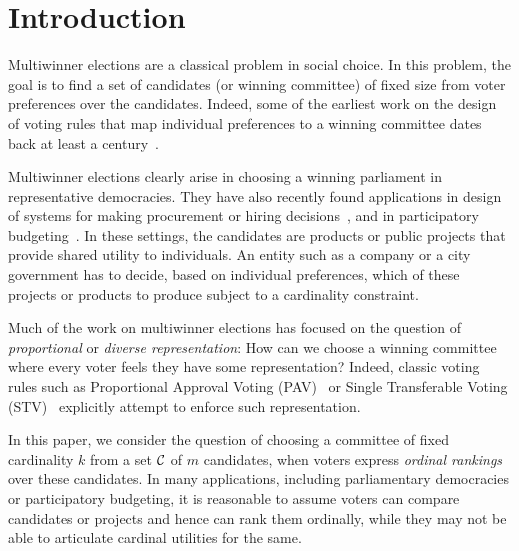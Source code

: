 \section{Introduction}
Multiwinner elections are a classical problem in social choice. In this problem, the goal is to find a set of candidates (or winning committee) of fixed size from voter preferences over the candidates. Indeed, some of the earliest work on the design of voting rules that map individual preferences to a winning committee dates back at least a century~\cite{Thiele}. 

Multiwinner elections clearly arise in choosing a winning parliament in representative democracies. They have also recently found applications in design of systems for making procurement or hiring decisions~\cite{LuB,SkworonFL}, and in participatory budgeting~\cite{goel2019knapsack,pb2}. In these settings, the candidates are products or public projects that provide shared utility to individuals. An entity such as a company or a city government has to decide, based on individual preferences, which of these projects or products to produce subject to a cardinality constraint. 

Much of the work on multiwinner elections has focused on the question of \emph{proportional} or \emph{diverse representation}: How can we choose a winning committee where every voter feels they have some representation? Indeed, classic voting rules such as Proportional Approval Voting (PAV)~\cite{Thiele} or Single Transferable Voting (STV)~\cite{Tideman} explicitly attempt to enforce such representation. %

In this paper, we consider the question of choosing a committee of fixed cardinality $k$ from a set $\mathcal{C}$ of $m$ candidates, when voters express \emph{ordinal rankings} over these candidates. In many applications, including parliamentary democracies or participatory budgeting, it is reasonable to assume voters can compare candidates or projects and hence can rank them ordinally, while they may not be able to articulate cardinal utilities for the same. 

